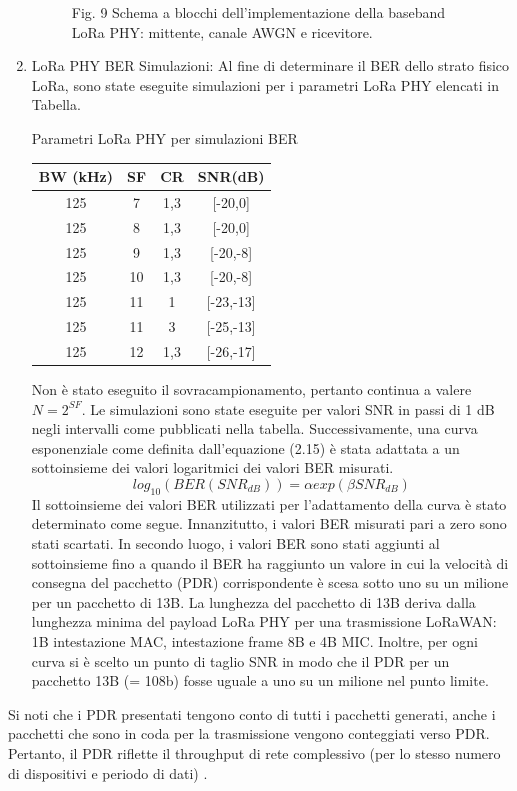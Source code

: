 \documentclass[a4paper]{report} %
\begin{document}
\begin{enumerate}
\begin{figure}
Fig. 9 Schema a blocchi dell'implementazione della baseband LoRa PHY: mittente, canale AWGN e ricevitore.
\end{figure}
\item LoRa PHY BER Simulazioni:  
Al fine di determinare il BER dello strato fisico LoRa, sono state eseguite simulazioni per i parametri LoRa PHY elencati in Tabella. 
\begin{center}
Parametri LoRa PHY per simulazioni BER
\begin{tabular}{|c|c|c|c}
BW (kHz)&SF&CR&SNR(dB)\\ \hline
125&7&1,3&[-20,0]\\ \hline
125&8&1,3&[-20,0]\\ \hline
125&9&1,3&[-20,-8]\\ \hline
125&10&1,3&[-20,-8]\\ \hline
125&11&1&[-23,-13]\\ \hline
125&11&3&[-25,-13]\\ \hline
125&12&1,3&[-26,-17]\\ \hline
\end{tabular}
\end{center}
Non è stato eseguito il sovracampionamento, pertanto continua a valere $N = 2^{SF}$. Le simulazioni sono state eseguite per valori SNR in passi di 1 dB negli intervalli come pubblicati nella tabella.
Successivamente, una curva esponenziale come definita dall'equazione (2.15) è stata adattata a un sottoinsieme dei valori logaritmici dei valori BER misurati.
\begin{equation}
log_{10}(BER (SNR_{dB})) = \alpha exp (\beta SNR_{dB})
\end{equation}
Il sottoinsieme dei valori BER utilizzati per l'adattamento della curva è stato determinato come segue. Innanzitutto, i valori BER misurati pari a zero sono stati scartati. In secondo luogo, i valori BER sono stati aggiunti al sottoinsieme fino a quando il BER ha raggiunto un valore in cui la velocità di consegna del pacchetto (PDR) corrispondente è scesa sotto uno su un milione per un pacchetto di 13B. La lunghezza del pacchetto di 13B deriva dalla lunghezza minima del payload LoRa PHY per una trasmissione LoRaWAN: 1B intestazione MAC, intestazione frame 8B e 4B MIC. Inoltre, per ogni curva si è scelto un punto di taglio SNR in modo che il PDR per un pacchetto 13B (= 108b) fosse uguale a uno su un milione nel punto limite.  
\end{enumerate}
Si noti che i PDR presentati tengono conto di tutti i pacchetti generati, anche i pacchetti che sono in coda per la trasmissione vengono conteggiati verso PDR. Pertanto, il PDR riflette il throughput di rete complessivo (per lo stesso numero di dispositivi e periodo di dati) \cite{art:rif.49}.
\end{document}
